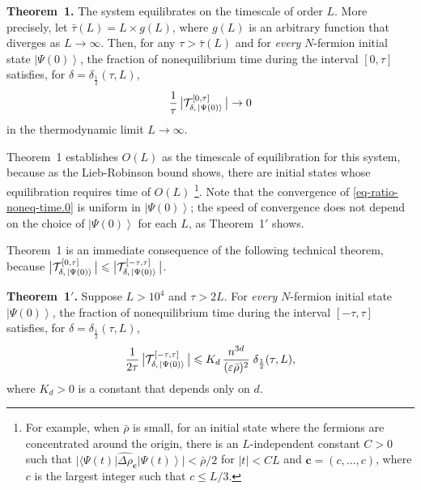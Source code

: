 \documentclass[aps,prl,superscriptaddress,reprint]{revtex4-2}
\newcommand{\bfthm}[1]{\noindent\textbf{#1}}
\theoremstyle{definition}
\newcommand{\abs}[1]{{\left\vert #1 \right\vert}}
\newcommand{\TT}{{\cal T}}
\newcommand{\ba}[1]{\bar{#1}}
\newcommand{\ket}[1]{\left|{#1}\right\rangle}
\newcommand{\bra}[1]{\langle{#1}|}
\newcommand{\sw}[2]{\bra{#1}{#2}\ket{#1}}
\newcommand{\wh}{\widehat}
\newcommand{\ta}{\tau}
\newcommand{\De}{\varDelta}
\newcommand{\ep}{\varepsilon}
\renewcommand{\r}{\rho}
\newcommand{\f}{\frac}
\newcommand{\ve}[1]{\boldsymbol{#1}}
\renewcommand{\le}{\leqslant}
\renewcommand{\leq}{\leqslant}
\newcommand{\noneq}{nonequilibrium}
\newcommand{\bd}{\delta}
\newcommand{\timescale}{timescale}
\begin{document}
\smallskip


\bfthm{Theorem~1.}
The system equilibrates on the {\timescale} of order $L$.
More precisely, let $\bar\tau(L) = L \times g(L)$, where $g(L)$ is an
arbitrary function that
diverges as $L \to \infty$.
Then, for any $\tau > \bar\tau(L)$ and for \emph{every} $N$-fermion initial state $\ket{\Psi(0)}$,
the fraction of {\noneq} time during the interval $[0, \tau]$ satisfies,
for $\delta = \delta_{\!\frac{1}{2}}\!(\tau, L)$,
\begin{align}
	\frac{1}{\tau} \, \bigl | \TT^{[0, \tau]}_{\delta, \,\ket{\Psi(0)}} \, \bigr | \to 0
\label{eq-ratio-noneq-time.0}
\end{align}
in the thermodynamic limit $L \to \infty$.


\medskip


Theorem~1 establishes $O(L)$ as the {\timescale} of equilibration
for this system, because
as the Lieb-Robinson bound \cite{LiebRobinson72} shows,
there are initial states whose
equilibration requires time of $O(L)$ \footnote{
  For example, when $\bar\rho$ is small, for an initial state where
  the fermions are concentrated around the origin,
  there is an $L$-independent  constant $C>0$ such that
  $\bigl | \sw{\Psi(t)}{\wh{\De\r}_{\ve c}} \bigr | <  \ba\r/2$ for
  $\abs t< C L$  and  $\ve c = (c,\dots,c)$,
  where $c$ is the largest integer such that $c\le L/3$.
}.
Note that the convergence of \eqref{eq-ratio-noneq-time.0} is uniform in $\ket{\Psi(0)}$;
the speed of convergence
does not depend on the choice of $\ket{\Psi(0)}$ for each $L$,
as Theorem~1$'$ shows.




Theorem~1 is an immediate consequence of the
following technical theorem,
because $\bigl | \TT^{[0, \tau]}_{\delta, \,\ket{\Psi(0)}} \, \bigr | \leq  \bigl | \TT^{[-\tau, \tau]}_{\delta, \,\ket{\Psi(0)}} \, \bigr |$.

\smallskip

\bfthm{Theorem~1$'$.}
Suppose $L > 10^4$ and $ \tau > 2L$.
For \emph{every} $N$-fermion initial state $\ket{\Psi(0)}$,
the fraction of {\noneq} time during the interval $[-\tau, \tau]$
satisfies,
for $\delta = \delta_{\!\frac{1}{2}}\!(\tau, L)$,
\begin{align}
	\frac{1}{2 \tau} \, \bigl | \TT^{[-\tau, \tau]}_{\delta, \,\ket{\Psi(0)}} \, \bigr |
  	\le
  	K_d \, \f{n^{3d}}{(\ep\ba\r)^2}\;\bd_{\f12}(\ta,L) ,
  	\label{eq-ratio-noneq-time}
\end{align}
where $K_d>0$ is a constant that depends only on $d$.
\end{document}
